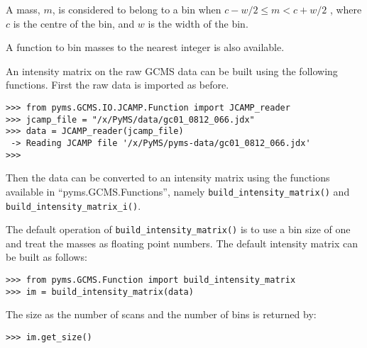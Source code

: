 A mass, $m$, is considered to belong to a bin when
$c - w/2 \le m < c + w/2$
, where $c$ is the centre of the bin, and $w$ is
the width of the bin.

A function to bin masses to the nearest integer is also available.




An intensity matrix on the raw GCMS data can be built using the following
functions. First the raw data is imported as before.

\begin{verbatim}
>>> from pyms.GCMS.IO.JCAMP.Function import JCAMP_reader
>>> jcamp_file = "/x/PyMS/data/gc01_0812_066.jdx"
>>> data = JCAMP_reader(jcamp_file)
 -> Reading JCAMP file '/x/PyMS/pyms-data/gc01_0812_066.jdx'
>>>
\end{verbatim}

\noindent
Then the data can be converted to an intensity matrix using the functions
available in ``pyms.GCMS.Functions'', namely {\tt build\_intensity\_matrix()}
and {\tt build\_intensity\_matrix\_i()}.

The default operation of {\tt build\_intensity\_matrix()} is to use a bin size
of one and treat the masses as floating point numbers. The default intensity
matrix can be built as follows:

\begin{verbatim}
>>> from pyms.GCMS.Function import build_intensity_matrix
>>> im = build_intensity_matrix(data)
\end{verbatim}

The size as the number of scans and the number of bins is returned by:
\begin{verbatim}
>>> im.get_size()
\end{verbatim}

